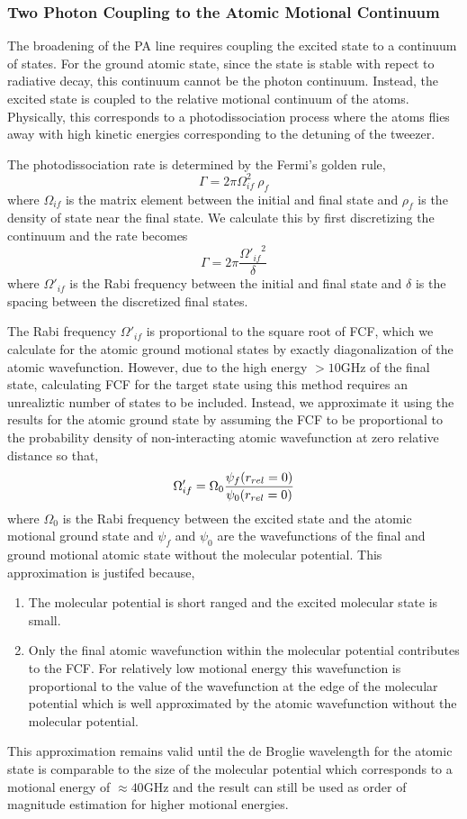 
\subsubsection{Two Photon Coupling to the Atomic Motional Continuum}
The broadening of the PA line requires coupling the excited state to a continuum of states.
For the ground atomic state, since the state is stable with repect to radiative decay,
this continuum cannot be the photon continuum.
Instead, the excited state is coupled to the relative motional continuum of the atoms.
Physically, this corresponds to a photodissociation process
where the atoms flies away with high kinetic energies corresponding
to the detuning of the tweezer.

The photodissociation rate is determined by the Fermi's golden rule,
\[
  \Gamma=2\pi\Omega_{if}^2\ \rho_f
\]
where $\Omega_{if}$ is the matrix element between the initial and final state
and $\rho_f$ is the density of state near the final state.
We calculate this by first discretizing the continuum and the rate becomes
\[
  \Gamma=2\pi\frac{{\Omega'_{if}}^2}{\delta}
\]
where $\Omega'_{if}$ is the Rabi frequency between the initial and final state
and $\delta$ is the spacing between the discretized final states.

The Rabi frequency $\Omega'_{if}$ is proportional to the square root of FCF,
which we calculate for the atomic ground motional states by exactly diagonalization
of the atomic wavefunction.
However, due to the high energy $>10\mathrm{GHz}$ of the final state,
calculating FCF for the target state using this method requires an unrealiztic number of
states to be included.
Instead, we approximate it using the results for the atomic ground state
by assuming the FCF to be proportional to the probability density of non-interacting
atomic wavefunction at zero relative distance so that,
\[
  \Omega'_{if}=\Omega_0\frac{\psi_f{\left({r_{rel}=0}\right)}}{\psi_0{\left({r_{rel}=0}\right)}}
\]
where $\Omega_0$ is the Rabi frequency between the excited state and
the atomic motional ground state and $\psi_f$ and $\psi_0$ are the
wavefunctions of the final and ground motional atomic state without the molecular potential.
This approximation is justifed because,
\begin{enumerate}
\item The molecular potential is short ranged and the excited molecular state is small.
\item Only the final atomic wavefunction within the molecular potential contributes to the FCF.
  For relatively low motional energy
  this wavefunction is proportional to the value of the wavefunction at
  the edge of the molecular potential which is well approximated by
  the atomic wavefunction without the molecular potential.
\end{enumerate}
This approximation remains valid until the de Broglie wavelength for the atomic state
is comparable to the size of the molecular potential which corresponds to
a motional energy of $\approx40\mathrm{GHz}$
and the result can still be used as order of magnitude estimation for higher motional energies.

